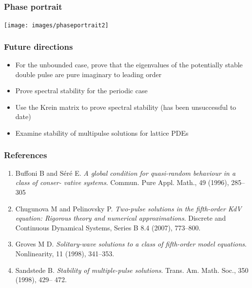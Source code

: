 \documentclass[16pt]{beamer}
\begin{document}
\begin{frame}
	\frametitle{Phase portrait}
	\fontsize{16}{7.2}\selectfont
	\begin{center}
	\texttt{[image: images/phaseportrait2]}
	\end{center}
\end{frame}

\begin{frame}
	\frametitle{Future directions}
	\fontsize{16}{7.2}\selectfont
	\begin{itemize}
		\item For the unbounded case, prove that the eigenvalues of the potentially stable double pulse are pure imaginary to leading order
		\item Prove spectral stability for the periodic case
		\item Use the Krein matrix to prove spectral stability (has been unsuccessful to date)
		\item Examine stability of multipulse solutions for lattice PDEs
	\end{itemize}
\end{frame}

\begin{frame}
	\frametitle{References}
	\fontsize{12}{7.2}\selectfont
	\begin{enumerate}
		\item Buffoni B and S\'er\'e E. \emph{A global condition for quasi-random behaviour in a class of conser- vative systems}. Commun. Pure Appl. Math., 49 (1996), 285–305
		\item Chugunova M and Pelinovsky P. \emph{Two-pulse solutions in the fifth-order KdV equation: Rigorous theory and numerical approximations}. Discrete and Continuous Dynamical Systems, Series B 8.4 (2007), 773–800.
		\item Groves M D. \emph{Solitary-wave solutions to a class of fifth-order model equations}. Nonlinearity, 11 (1998), 341–353.
		\item Sandstede B. \emph{Stability of multiple-pulse solutions}. Trans. Am. Math. Soc., 350 (1998), 429– 472.
	\end{enumerate}
\end{frame}
 
\end{document}

